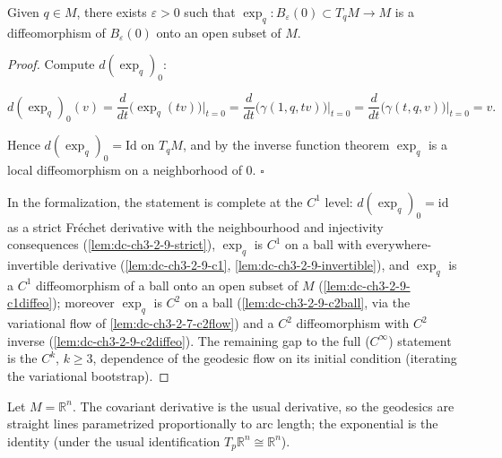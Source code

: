 \begin{proposition}
  \label{prop:dc-ch3-2-9}
  \notready
  Given $q\in M$, there exists $\varepsilon>0$ such that
  $\exp_q:B_\varepsilon(0)\subset T_qM\to M$ is a diffeomorphism of
  $B_\varepsilon(0)$ onto an open subset of $M$.
\end{proposition}
\begin{proof}
  Compute $d(\exp_q)_0$:
  
  $$
  d(\exp_q)_0(v)=\frac{d}{dt}\big(\exp_q(tv)\big)\Big|_{t=0}=\frac{d}{dt}\big(\gamma(1,q,tv)\big)\Big|_{t=0}=\frac{d}{dt}\big(\gamma(t,q,v)\big)\Big|_{t=0}=v.
  $$
  
  Hence $d(\exp_q)_0=\mathrm{Id}$ on $T_qM$, and by the inverse function theorem
  $\exp_q$ is a local diffeomorphism on a neighborhood of $0$. $\square$

  In the formalization, the statement is complete at the $C^1$ level:
  $d(\exp_q)_0 = \mathrm{id}$ as a strict Fréchet derivative with the
  neighbourhood and injectivity consequences (\cref{lem:dc-ch3-2-9-strict}),
  $\exp_q$ is $C^1$ on a ball with everywhere-invertible derivative
  (\cref{lem:dc-ch3-2-9-c1}, \cref{lem:dc-ch3-2-9-invertible}), and $\exp_q$
  is a $C^1$ diffeomorphism of a ball onto an open subset of $M$
  (\cref{lem:dc-ch3-2-9-c1diffeo}); moreover $\exp_q$ is $C^2$ on a ball
  (\cref{lem:dc-ch3-2-9-c2ball}, via the variational flow of
  \cref{lem:dc-ch3-2-7-c2flow}) and a $C^2$ diffeomorphism with $C^2$ inverse
  (\cref{lem:dc-ch3-2-9-c2diffeo}). The remaining gap to the full
  ($C^\infty$) statement is the $C^k$, $k \ge 3$, dependence of the geodesic
  flow on its initial condition (iterating the variational bootstrap).
\end{proof}

\begin{example}
  \label{ex:dc-ch3-2-10}
  \notready
  Let $M=\mathbb{R}^n$. The covariant derivative is the usual derivative, so the
  geodesics are straight lines parametrized proportionally to arc length; the
  exponential is the identity (under the usual identification $T_p\mathbb{R}^n\cong\mathbb{R}^n$).
\end{example}

